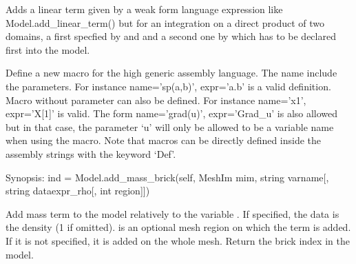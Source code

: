 \documentclass[a4paper,11pt,english]{sphinxmanual}
\begin{document}
\begin{fulllineitems}
\begin{fulllineitems}
Adds a linear term given by a weak form language expression like
Model.add\_linear\_term() but for an integration on a direct
product of two domains, a first specfied by  and 
and a second one by  which has to be declared
first into the model.

\end{fulllineitems}


\begin{fulllineitems}
\label{\detokenize{python/cmdref_Model:getfem.Model.add_macro}}
Define a new macro for the high generic assembly language.
The name include the parameters. For instance name=’sp(a,b)’, expr=’a.b’
is a valid definition. Macro without parameter can also be defined.
For instance name=’x1’, expr=’X{[}1{]}’ is valid. The form name=’grad(u)’,
expr=’Grad\_u’ is also allowed but in that case, the parameter ‘u’ will
only be allowed to be a variable name when using the macro. Note that
macros can be directly defined inside the assembly strings with the
keyword ‘Def’.

\end{fulllineitems}


\begin{fulllineitems}
\label{\detokenize{python/cmdref_Model:getfem.Model.add_mass_brick}}
Synopsis: ind = Model.add\_mass\_brick(self, MeshIm mim, string varname{[}, string dataexpr\_rho{[}, int region{]}{]})

Add mass term to the model relatively to the variable .
If specified, the data  is the
density (1 if omitted).  is an optional mesh region on
which the term is added. If it is not specified, it
is added on the whole mesh. Return the brick index in the model.

\end{fulllineitems}


\end{fulllineitems}
\end{document}
